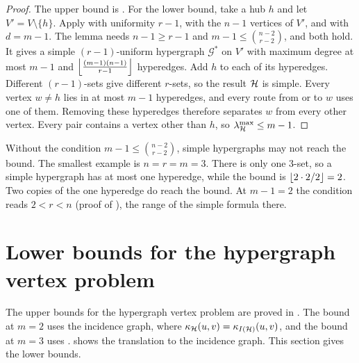 \begin{proof}
The upper bound is .
For the lower bound, take a hub $h$ and let $V' = V \setminus \{h\}$.
Apply  with uniformity $r-1$, with the $n-1$ vertices of $V'$, and with $d = m-1$.
The lemma needs $n-1 \ge r-1$ and $m-1 \le \binom{n-2}{r-2}$, and both hold.
It gives a simple $(r-1)$-uniform hypergraph $\mathcal{G}^*$ on $V'$ with maximum degree at most $m-1$ and $\left\lfloor \frac{(m-1)(n-1)}{r-1} \right\rfloor$ hyperedges.
Add $h$ to each of its hyperedges. Different $(r-1)$-sets give different $r$-sets, so the result $\mathcal{H}$ is simple.
Every vertex $w \ne h$ lies in at most $m-1$ hyperedges, and every route from or to $w$ uses one of them.
Removing these hyperedges therefore separates $w$ from every other vertex.
Every pair contains a vertex other than $h$, so $\lambda^{\max}_{\mathcal{H}} \le m-1$.
\end{proof}

\begin{remark}\label{rem:simple-hyper-necessary}
Without the condition $m-1\le\binom{n-2}{r-2}$, simple hypergraphs may not reach the bound.
The smallest example is $n = r = m = 3$.
There is only one $3$-set, so a simple hypergraph has at most one hyperedge, while the bound is $\left\lfloor 2 \cdot 2 / 2 \right\rfloor = 2$.
Two copies of the one hyperedge do reach the bound.
At $m - 1 = 2$ the condition reads $2 < r < n$ (proof of ), the range of the simple formula there.
\end{remark}

\section{Lower bounds for the hypergraph vertex problem}\label{sec:hyper-vertex-proof}

The upper bounds for the hypergraph vertex problem are proved in .
The bound at $m=2$ uses the incidence graph, where $\kappa_{\mathcal{H}}(u,v)=\kappa_{I(\mathcal{H})}(u,v)$, and the bound at $m=3$ uses .
 shows the translation to the incidence graph. This section gives the lower bounds.

